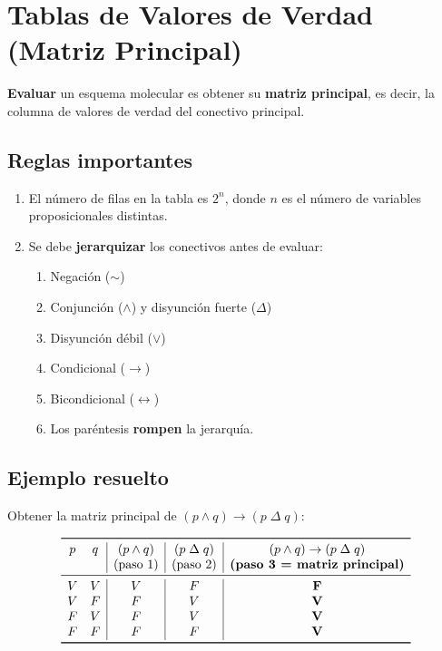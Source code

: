 \documentclass[12pt,a4paper]{article}
\begin{document}
\section{Tablas de Valores de Verdad (Matriz Principal)}

\begin{definicion}
\textbf{Evaluar} un esquema molecular es obtener su \textbf{matriz principal}, es decir,
la columna de valores de verdad del conectivo principal.
\end{definicion}

\subsection{Reglas importantes}

\begin{enumerate}[leftmargin=1.5cm]
  \item El número de filas en la tabla es $2^{n}$, donde $n$ es el número de variables
        proposicionales distintas.
  \item Se debe \textbf{jerarquizar} los conectivos antes de evaluar:
        \begin{enumerate}[label=\arabic*$^\circ$]
          \item Negación ($\sim$)
          \item Conjunción ($\wedge$) y disyunción fuerte ($\Delta$)
          \item Disyunción débil ($\vee$)
          \item Condicional ($\rightarrow$)
          \item Bicondicional ($\leftrightarrow$)
          \item Los paréntesis \textbf{rompen} la jerarquía.
        \end{enumerate}
\end{enumerate}

\subsection{Ejemplo resuelto}

Obtener la matriz principal de $(p \wedge q) \rightarrow (p \;\Delta\; q)$:

\[
\begin{array}{cc|c|c|c}
\toprule
p & q & (p \wedge q) & (p \;\Delta\; q) & (p \wedge q) \rightarrow (p \;\Delta\; q) \\
  &   & \text{(paso 1)} & \text{(paso 2)} & \textbf{(paso 3 = matriz principal)} \\
\midrule
V & V & V & F & \mathbf{F} \\
V & F & F & V & \mathbf{V} \\
F & V & F & V & \mathbf{V} \\
F & F & F & F & \mathbf{V} \\
\bottomrule
\end{array}
\]
\end{document}
